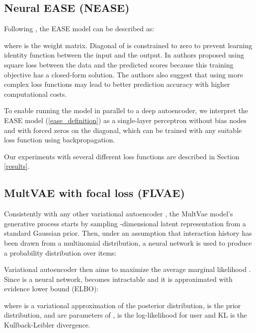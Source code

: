 \documentclass[conference]{IEEEtran}
\begin{document}
    \subsection{Neural EASE (NEASE)}
        
        Following \cite{Steck2019}, the EASE model can be described as:
        
            
        
        where  is the weight matrix. Diagonal of  is constrained to zero to prevent learning identity function between the input and the output. In \cite{Steck2019} authors proposed using square loss between the data  and the predicted scores  because this training objective has a closed-form solution. The authors also suggest that using more complex loss functions may lead to better prediction accuracy with higher computational costs.
        
        To enable running the model in parallel to a deep autoencoder, we interpret the EASE model (\ref{ease_definition}) as a single-layer perceptron  without bias nodes and with forced zeros on the diagonal, which can be trained with any suitable loss function using backpropagation.
        
        Our experiments with several different loss functions are described in Section \ref{results}.
         
    \subsection{MultVAE with focal loss (FLVAE)}

        Consistently with any other variational autoencoder \cite{Kingma2014}, the MultVae model's generative process starts by sampling -dimensional latent representation  from a standard Gaussian prior\cite{Liang2018}. 
        Then, under an assumption that interaction history  has been drawn from a multinomial distribution, a neural network  is used to produce a probability distribution  over  items:
            

        Variational autoencoder then aims to maximize the average marginal likelihood  . Since  is a neural network,  becomes intractable and it is approximated with evidence lower bound (ELBO):
        
            
        
        where  is a variational approximation of the posterior
        distribution,  is the prior distribution,  and  are parameters of ,  is the log-likelihood for user  and KL is the Kullback-Leibler divergence.
        
\end{document}
